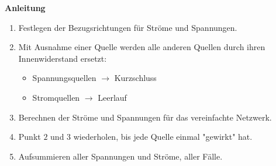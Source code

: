 \textbf{Anleitung} \\
\begin{enumerate}
    \item Festlegen der Bezugsrichtungen für Ströme und Spannungen.
    \item Mit Ausnahme einer Quelle werden alle anderen Quellen durch ihren Innenwiderstand ersetzt:
    \begin{itemize}
        \item Spannungsquellen $\rightarrow$ Kurzschluss
        \item Stromquellen $\rightarrow$ Leerlauf
    \end{itemize}
    \item Berechnen der Ströme und Spannungen für das vereinfachte Netzwerk.
    \item Punkt $2$ und $3$ wiederholen, bis jede Quelle einmal "gewirkt" hat.
    \item Aufsummieren aller Spannungen und Ströme, aller Fälle. 
\end{enumerate}

